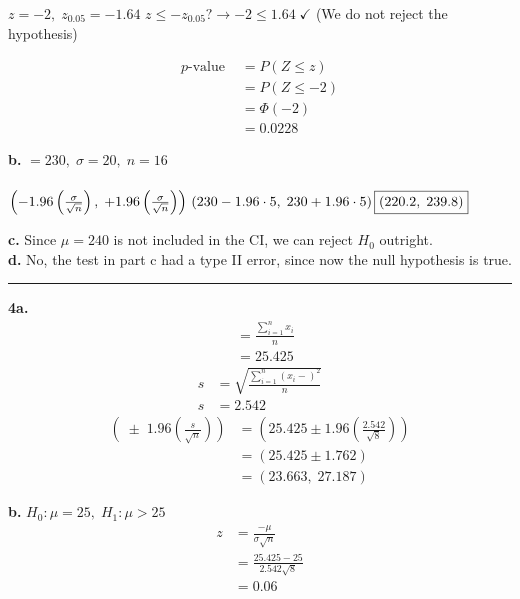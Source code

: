\documentclass[12pt]{report}
\makeatletter
\newcommand*{\xbar}{}%
\DeclareRobustCommand*{\xbar}{%
	\mathpalette\@xbar{}%
}
\newcommand*{\@xbar}[2]{%
	\sbox0{$#1\mathrm{x}\m@th$}%
	\sbox2{$#1x\m@th$}%
	\rlap{%
		\hbox to\wd2{%
			\hfill
			$\overline{%
				\vrule width 0pt height\ht0 %
				\kern\wd0 %
			}$%
		}%
	}%
	\copy2 %
}
\newcommand{\sep}{\bigskip\hrule\bigskip}
\makeatother
\begin{document}
$z = -2, \; z_{0.05} = -1.64$
$z \leq -z_{0.05}? \rightarrow \boxed{-2 \leq 1.64 \;\checkmark}$ (We do not reject the hypothesis)

\begin{align*}
	p\text{-value } &= P(Z \leq z)\\
	&= P(Z \leq -2)\\
	&= \Phi(-2)\\
	&= \boxed{0.0228}
\end{align*}

\pagebreak
\noindent \textbf{b.} $\xbar = 230, \; \sigma = 20, \; n = 16$\\\\
\begin{math}
\left(\xbar - 1.96\left(\frac{\sigma}{\sqrt{n}}\right), \;\xbar + 1.96\left(\frac{\sigma}{\sqrt{n}}\right)\right)\\
\left(230 - 1.96 \cdot 5, \; 230 + 1.96 \cdot 5\right)\\
\boxed{(220.2,\; 239.8)}\\
\end{math}

\noindent \textbf{c.} Since $\mu = 240$ is not included in the CI, we can reject $H_0$ outright.\\

\noindent \textbf{d.} No, the test in part c had a type II error, since now the null hypothesis is true.
\sep

\noindent \textbf{4a.} 
\begin{align*}
	\xbar &= \frac{\sum_{i=1}^{n}{x_i}}{n}\\
	\xbar &= 25.425
\end{align*}
\begin{align*}
	s &= \sqrt{\frac{\sum_{i=1}^{n}(x_i-\xbar)^2}{n}}\\
	s &= 2.542
\end{align*}
\begin{align*}
	\left(\xbar\; \pm \; 1.96\left(\frac{s}{\sqrt{n}}\right)\right) &= \left(25.425 \pm 1.96\left(\frac{2.542}{\sqrt{8}}\right)\right)\\
	&= (25.425 \pm 1.762)\\
	&= \boxed{(23.663, \;27.187)}
\end{align*}

\noindent \textbf{b.} $H_0: \mu = 25,\; H_1: \mu > 25$
\begin{align*}
	z &= \frac{\xbar - \mu}{\sigma\sqrt{n}}\\
	&= \frac{25.425 - 25}{2.542\sqrt{8}}\\
	&= 0.06
\end{align*}
\end{document}
